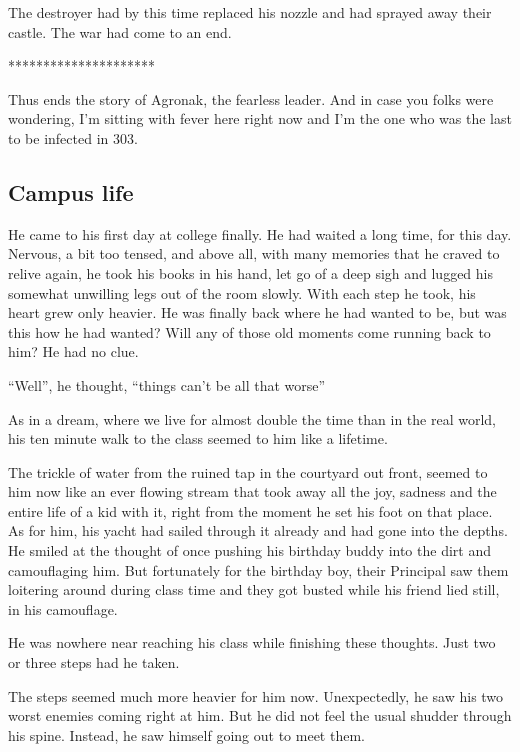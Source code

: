 \documentclass[twoside,11pt]{article}
\begin{document}
The destroyer had by this time replaced his nozzle and had sprayed away their castle. The war had come to an end.

\bigskip
\begin{center}
*********************
\end{center}


Thus ends the story of Agronak, the fearless leader. And in case you folks were wondering, I'm sitting with fever here right now and I'm the one who was the last to be infected in 303.

\newpage
\begin{center}
  \section{Campus life}
\end{center}
\bigskip
\bigskip
\bigskip


He came to his first day at college finally. He had waited a long time, for this day. Nervous, a bit too tensed, and above all, with many memories that he craved to relive again, he took his books in his hand, let go of a deep sigh and lugged his somewhat unwilling legs out of the room slowly. With each step he took, his heart grew only heavier. He was finally back where he had wanted to be, but was this how he had wanted? Will any of those old moments come running back to him? He had no clue.

``Well'', he thought, ``things can't be all that worse''

As in a dream, where we live for almost double the time than in the real world, his ten minute walk to the class seemed to him like a lifetime.

The trickle of water from the ruined tap in the courtyard out front, seemed to him now like an ever flowing stream that took away all the joy, sadness and the entire life of a kid with it, right from the moment he set his foot on that place. As for him, his yacht had sailed through it already and had gone into the depths. He smiled at the thought of once pushing his birthday buddy into the dirt and camouflaging him. But fortunately for the birthday boy, their Principal saw them loitering around during class time and they got busted while his friend lied still, in his camouflage.

He was nowhere near reaching his class while finishing these thoughts. Just two or three steps had he taken.

The steps seemed much more heavier for him now. Unexpectedly, he saw his two worst enemies coming right at him. But he did not feel the usual shudder through his spine. Instead, he saw himself going out to meet them.
\end{document}

